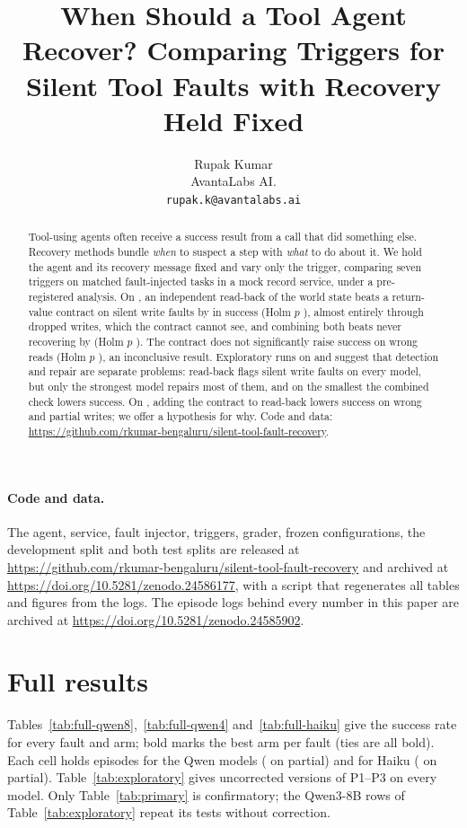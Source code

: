 \documentclass[10pt]{article}
\author{Rupak Kumar\\ AvantaLabs AI.\\ \texttt{rupak.k@avantalabs.ai}}
\title{When Should a Tool Agent Recover? Comparing Triggers for Silent Tool Faults with Recovery Held Fixed}
\date{}
\begin{document}
\maketitle
\begin{abstract}
Tool-using agents often receive a success result from a call that did something else. Recovery
methods bundle \emph{when} to suspect a step with \emph{what} to do about it. We hold the agent and
its recovery message fixed and vary only the trigger, comparing seven triggers on matched
fault-injected tasks in a mock record service, under a pre-registered analysis. On \RQwenEightModel{},
an independent read-back of the world state beats a return-value contract on silent write faults by
\RPOneDiff{} in success (Holm $p$ \RPOneHolmP{}), almost entirely through dropped writes, which the
contract cannot see, and combining both beats never recovering by \RPThreeDiff{} (Holm $p$
\RPThreeHolmP{}). The contract does not significantly raise success on wrong reads (Holm $p$
\RPTwoHolmP{}), an inconclusive result. Exploratory runs on \RQwenFourModel{} and \RHaikuModel{}
suggest that detection and repair are separate problems: read-back flags silent write faults on every
model, but only the strongest model repairs most of them, and on the smallest the combined check
lowers success. On \RHaikuModel{}, adding the contract to read-back lowers success on wrong and partial
writes; we offer a hypothesis for why. Code and data:
\url{https://github.com/rkumar-bengaluru/silent-tool-fault-recovery}.
\end{abstract}







\paragraph{Code and data.} The agent, service, fault injector, triggers, grader, frozen configurations,
the development split and both test splits are released at
\url{https://github.com/rkumar-bengaluru/silent-tool-fault-recovery} and archived at
\url{https://doi.org/10.5281/zenodo.24586177}, with a script that regenerates all tables and figures
from the logs. The episode logs behind every number in this paper are archived at
\url{https://doi.org/10.5281/zenodo.24585902}.
\label{endofmain}


\appendix
\section{Full results}\label{app:tables}
Tables~\ref{tab:full-qwen8},~\ref{tab:full-qwen4} and~\ref{tab:full-haiku} give the success rate for
every fault and arm; bold marks the best arm per fault (ties are all bold). Each cell holds
\RQwenEightDropReadbackN{} episodes for the Qwen models (\RQwenEightPartialReadbackN{} on partial) and
\RHaikuDropReadbackN{} for Haiku (\RHaikuPartialReadbackN{} on partial). Table~\ref{tab:exploratory}
gives uncorrected versions of P1--P3 on every model. Only Table~\ref{tab:primary} is confirmatory; the
Qwen3-8B rows of Table~\ref{tab:exploratory} repeat its tests without correction.
\end{document}
